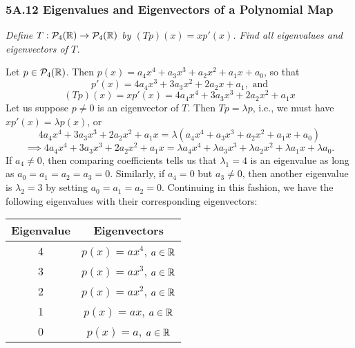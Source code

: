 \documentclass{article}
\begin{document}
\subsubsection*{5A.12 Eigenvalues and Eigenvectors of a Polynomial Map}
\textit{Define $T: \mathcal P_4(\mathbb R) \to \mathcal P_4(\mathbb R)$ by $(Tp)(x) = xp'(x)$. Find all eigenvalues and eigenvectors of $T$.}
\begin{solution}
Let $p\in \mathcal P_4(\mathbb R)$. Then $p(x) = a_4x^4 + a_3x^3 + a_2x^2 + a_1x + a_0$, so that
$$p'(x) = 4a_4x^3 + 3a_3x^2 + 2a_2x + a_1, \textrm{ and}$$
$$(Tp)(x) = xp'(x) = 4a_4x^4 + 3a_3x^3 + 2a_2x^2 + a_1x$$
Let us suppose $p\neq 0$ is an eigenvector of $T$. Then $Tp = \lambda p$, i.e., we must have $xp'(x) = \lambda p(x)$, or
$$4a_4x^4 + 3a_3x^3 + 2a_2x^2 + a_1x = \lambda(a_4x^4 + a_3x^3 + a_2x^2 + a_1x + a_0)$$
$$\implies 4a_4x^4 + 3a_3x^3 + 2a_2x^2 + a_1x = \lambda a_4x^4 + \lambda a_3x^3 + \lambda a_2x^2 + \lambda a_1 x + \lambda a_0.$$
If $a_4 \neq 0$, then comparing coefficients tells us that $\lambda_1 = 4$ is an eigenvalue as long as $a_0 = a_1 = a_2 = a_3 = 0$. Similarly, if $a_4 = 0$ but $a_3\neq 0$, then another eigenvalue is $\lambda_2 = 3$ by setting $a_0 = a_1 = a_2 = 0$. Continuing in this fashion, we have the following eigenvalues with their corresponding eigenvectors:
\begin{center}
\begin{tabular}{|c|c|}\hline
    Eigenvalue & Eigenvectors  \\ \hline
    4 & $p(x) = ax^4$, $a\in \mathbb R$ \\
    3 & $p(x) = ax^3$, $a\in \mathbb R$ \\
    2 & $p(x) = ax^2$, $a\in \mathbb R$ \\
    1 & $p(x) = ax$, $a\in \mathbb R$ \\
    0 & $p(x) = a$, $a\in \mathbb R$ \\ \hline
\end{tabular}
\end{center}
\end{solution}
\end{document}
